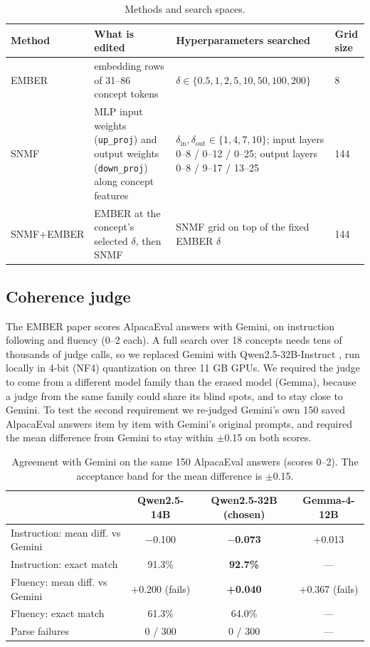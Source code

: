 \documentclass[11pt]{article}
\begin{document}
\begin{table}[t]
\centering\small
\begin{tabular}{@{}p{}p{}p{}p{}@{}}
\toprule
Method & What is edited & Hyperparameters searched & Grid size \\
\midrule
EMBER & embedding rows of 31--86 concept tokens & $\delta\in\{0.5,1,2,5,10,50,100,200\}$ & 8 \\
SNMF & MLP input weights (\texttt{up\_\allowbreak{}proj}) and output weights (\texttt{down\_\allowbreak{}proj}) along concept features & $\delta_{\mathrm{in}},\delta_{\mathrm{out}}\in\{1,4,7,10\}$; input layers 0--8 / 0--12 / 0--25; output layers 0--8 / 9--17 / 13--25 & 144 \\
SNMF+EMBER & EMBER at the concept's selected $\delta$, then SNMF & SNMF grid on top of the fixed EMBER $\delta$ & 144 \\
\bottomrule
\end{tabular}
\caption{Methods and search spaces.}
\label{tab:2}
\end{table}

\subsection{Coherence judge}\label{sec:3.4}

The EMBER paper scores AlpacaEval answers with Gemini, on instruction following and fluency (0--2 each). A full search over 18 concepts needs tens of thousands of judge calls, so we replaced Gemini with Qwen2.5-32B-Instruct \citep{qwen2024qwen25}, run locally in 4-bit (NF4) quantization \citep{dettmers2023qlora} on three 11 GB GPUs. We required the judge to come from a different model family than the erased model (Gemma), because a judge from the same family could share its blind spots, and to stay close to Gemini. To test the second requirement we re-judged Gemini's own 150 saved AlpacaEval answers item by item with Gemini's original prompts, and required the mean difference from Gemini to stay within $\pm$0.15 on both scores.

\begin{table}[t]
\centering\small
\begin{tabular}{@{}lccc@{}}
\toprule
 & Qwen2.5-14B & \textbf{Qwen2.5-32B (chosen)} & Gemma-4-12B \\
\midrule
Instruction: mean diff. vs Gemini & $-$0.100 & \textbf{$-$0.073} & +0.013 \\
Instruction: exact match & 91.3\% & \textbf{92.7\%} & --- \\
Fluency: mean diff. vs Gemini & +0.200 (fails) & \textbf{+0.040} & +0.367 (fails) \\
Fluency: exact match & 61.3\% & 64.0\% & --- \\
Parse failures & 0 / 300 & 0 / 300 & --- \\
\bottomrule
\end{tabular}
\caption{Agreement with Gemini on the same 150 AlpacaEval answers (scores 0--2). The acceptance band for the mean difference is $\pm$0.15.}
\label{tab:3}
\end{table}
\end{document}

